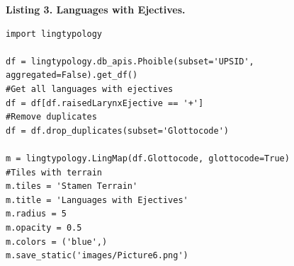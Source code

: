 \documentclass[a4paper,12pt]{article}
\begin{document}
\textbf{Listing 3. Languages with Ejectives.}
\begin{lstlisting}
import lingtypology

df = lingtypology.db_apis.Phoible(subset='UPSID', aggregated=False).get_df()
#Get all languages with ejectives
df = df[df.raisedLarynxEjective == '+']
#Remove duplicates
df = df.drop_duplicates(subset='Glottocode')

m = lingtypology.LingMap(df.Glottocode, glottocode=True)
#Tiles with terrain
m.tiles = 'Stamen Terrain'
m.title = 'Languages with Ejectives'
m.radius = 5
m.opacity = 0.5
m.colors = ('blue',)
m.save_static('images/Picture6.png')
\end{lstlisting}
\end{document}
